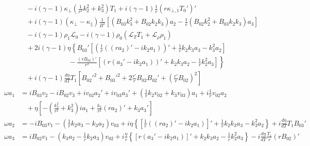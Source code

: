 \documentclass[11pt, fleqn]{article}
\newcommand{\HL}{\mathscr{L}}
\begin{document}
\begin{equation}
\begin{aligned}
					      &~~~~ - i(\gamma - 1)\kappa_\bot\left(\frac{1}{r^2}k_2^2 + k_3^2\right)T_1 + i(\gamma - 1)\frac{1}{r}(r\kappa_{\bot, 1}T_0')'																					\\
						  &~~~~ + i(\gamma - 1)(\kappa_\bot - \kappa_\parallel)\frac{1}{B^2}\left[(B_{03}k_3^2 + B_{02}k_2k_3)a_2 - \frac{1}{r}(B_{02}k_2^2 + B_{03}k_2k_3)a_3\right]													\\
						  &~~~~ - i(\gamma - 1)\rho_1\HL_0 - i(\gamma - 1)\rho_0(\HL_T T_1 + \HL_\rho \rho_1)																															\\
						  &~~~~ +2i(\gamma - 1)\eta\left\{B_{03}'\left[\left(\frac{1}{r}\left((ra_2)' - ik_2a_1\right)\right)' + \frac{1}{r}k_2k_3a_3 - k_3^2a_2\right]\right.															\\
						  &~~~~ \left. \qquad\qquad\qquad  ~ -\frac{(rB_{02})'}{r^2}\left[\left(r(a_3' - ik_2a_1)\right)' + k_2k_3a_2 - \frac{1}{r}k_2^2a_3\right] \right\} 															\\
						  &~~~~ + i(\gamma - 1)\frac{d\eta}{dT}T_1\left[B_{02}'^2 + B_{03}'^2 + 2\frac{r'}{r}B_{02}B_{02}' + \left(\frac{r'}{r}B_{02}\right)^2\right]												      				\\[8pt]
		\omega a_1		  &= iB_{03}v_2 - iB_{02}v_3 + iv_{02}a_2' + iv_{03}a_3' + \left(\frac{1}{r}k_2v_{02} + k_3v_{03}\right)a_1 + i\frac{1}{r}v_{02}a_2																				\\
						  &~~~~ + \eta\left[-\left(\frac{k_2^2}{r^2} + k_3^2\right) ia_1 + \frac{k_2}{r^2}(ra_2)' + k_3a_3'\right]							  																			\\[8pt]
		\omega a_2		  &= -iB_{03}v_1 - \left(\frac{1}{r}k_2a_3 - k_3a_2\right)v_{03} + i\eta\left\{\left[\frac{1}{r}\left((ra_2)' - ik_2a_1\right)\right]' + \frac{1}{r}k_2k_3a_3 - k_3^2a_2\right\} + i\frac{d\eta}{dT}T_1B_{03}'	\\[8pt]
		\omega a_3		  &=  iB_{02}v_1 - \left(k_3a_2 - \frac{1}{r}k_2a_3\right)v_{02} + i\frac{\eta}{r}\left\{\left[r(a_3' - ik_2a_1)\right]' + k_2k_3a_2 - \frac{1}{r}k_2^2a_3\right\} - i\frac{d\eta}{dT}\frac{T_1}{r}(rB_{02})'	
	\end{aligned}
\end{equation}

\newpage
\end{document}
